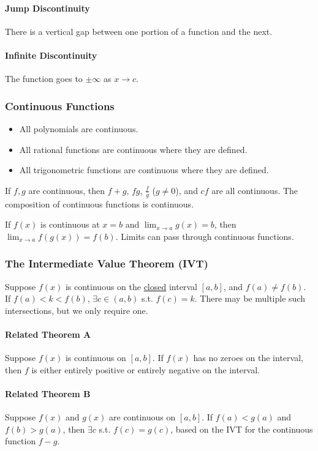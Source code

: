 \documentclass{article}
\begin{document}
\paragraph{Jump Discontinuity} There is a vertical gap between one portion of a function and the next.
\paragraph{Infinite Discontinuity} The function goes to $\pm \infty$ as $x \to c$.

\subsubsection{Continuous Functions}
\begin{itemize}
    \item All polynomials are continuous.
    \item All rational functions are continuous where they are defined.
    \item All trigonometric functions are continuous where they are defined.
\end{itemize}

If $f,g$ are continuous, then $f+g$, $fg$, $\frac{f}{g}$ ($g\ne0$), and $cf$ are all continuous. The composition of continuous functions is continuous.

If $f(x)$ is continuous at $x=b$ and $\lim_{x\to a}g(x) = b$, then $\lim_{x\to a}f(g(x)) = f(b)$. Limits can pass through continuous functions.

\subsubsection{The Intermediate Value Theorem (IVT)}
Suppose $f(x)$ is continuous on the \underline{closed} interval $[a,b]$, and $f(a)\ne f(b)$. If $f(a) < k < f(b)$, $\exists c \in (a,b)$ s.t. $f(c)=k$. There may be multiple such intersections, but we only require one.

\paragraph{Related Theorem A}
Suppose $f(x)$ is continuous on $[a,b]$. If $f(x)$ has no zeroes on the interval, then $f$ is either entirely positive or entirely negative on the interval.

\paragraph{Related Theorem B}
Suppose $f(x)$ and $g(x)$ are continuous on $[a,b]$. If $f(a) < g(a)$ and $f(b) > g(a)$, then $\exists c$ s.t. $f(c) = g(c)$, based on the IVT for the continuous function $f-g$.
\end{document}
